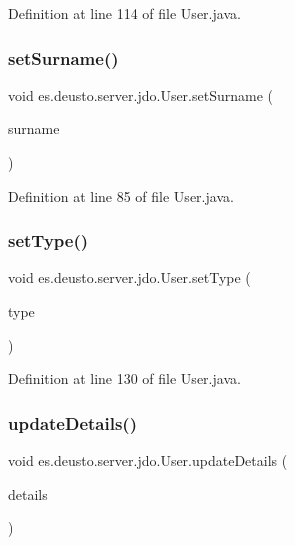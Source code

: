 Definition at line 114 of file User.\+java.

\mbox{\label{classes_1_1deusto_1_1server_1_1jdo_1_1_user_ae429a21d0538859e2300e94ef0a9257a}} 
\subsubsection{\texorpdfstring{setSurname()}{setSurname()}}
{\footnotesize\ttfamily void es.\+deusto.\+server.\+jdo.\+User.\+set\+Surname (\begin{DoxyParamCaption}\item[{String}]{surname }\end{DoxyParamCaption})}



Definition at line 85 of file User.\+java.

\mbox{\label{classes_1_1deusto_1_1server_1_1jdo_1_1_user_ac56a41d0180453b832c405cc0d94d170}} 
\subsubsection{\texorpdfstring{setType()}{setType()}}
{\footnotesize\ttfamily void es.\+deusto.\+server.\+jdo.\+User.\+set\+Type (\begin{DoxyParamCaption}\item[{\mbox{\hyperlink{enumes_1_1deusto_1_1server_1_1jdo_1_1_user_type}{User\+Type}}}]{type }\end{DoxyParamCaption})}



Definition at line 130 of file User.\+java.

\mbox{\label{classes_1_1deusto_1_1server_1_1jdo_1_1_user_a2abb7df132d0ded1f4187d900416d65d}} 
\subsubsection{\texorpdfstring{updateDetails()}{updateDetails()}}
{\footnotesize\ttfamily void es.\+deusto.\+server.\+jdo.\+User.\+update\+Details (\begin{DoxyParamCaption}\item[{\mbox{\hyperlink{classes_1_1deusto_1_1server_1_1data_1_1_user_details_d_t_o}{User\+Details\+D\+TO}}}]{details }\end{DoxyParamCaption})}



